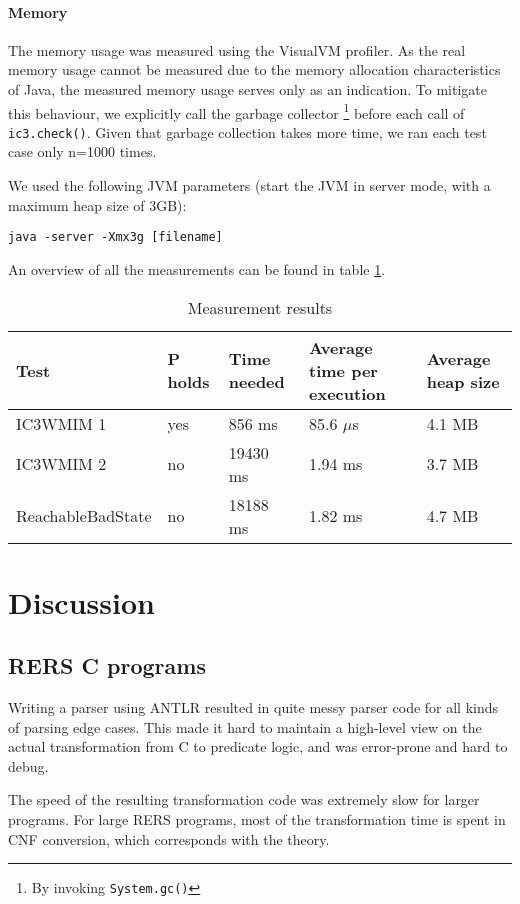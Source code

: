 \documentclass[a4paper]{article}
\begin{document}
\paragraph{Memory} The memory usage was measured using the VisualVM profiler. As the real memory usage cannot be measured due to the memory allocation characteristics of Java, the measured memory usage serves only as an indication. To mitigate this behaviour, we explicitly call the garbage collector \footnote{By invoking \texttt{System.gc()}} before each call of \texttt{ic3.check()}. Given that garbage collection takes more time, we ran each test case only n=1000 times.


We used the following JVM parameters (start the JVM in server mode, with a maximum heap size of 3GB):

\texttt{java -server -Xmx3g [filename]}

An overview of all the measurements can be found in table \ref{tab:measurements}.

\begin{table}
\begin{tabularx}{\linewidth}{lllXl}
Test & P holds & Time needed & Average time per execution & Average heap size\\\hline
IC3WMIM 1 & yes & 856 ms & 85.6 $\mu$s & 4.1 MB\\
IC3WMIM 2 & no & 19430 ms & 1.94 ms & 3.7 MB\\
ReachableBadState & no & 18188 ms & 1.82 ms & 4.7 MB
\end{tabularx}
\label{tab:measurements}
\caption{Measurement results}
\end{table}

\section{Discussion}
\subsection{RERS C programs}
Writing a parser using ANTLR resulted in quite messy parser code for all kinds of parsing edge cases.
This made it hard to maintain a high-level view on the actual transformation from C to predicate logic, and was error-prone and hard to debug.

The speed of the resulting transformation code was extremely slow for larger programs. For large RERS programs, most of the transformation time is spent in CNF conversion, which corresponds with the theory.
\end{document}
